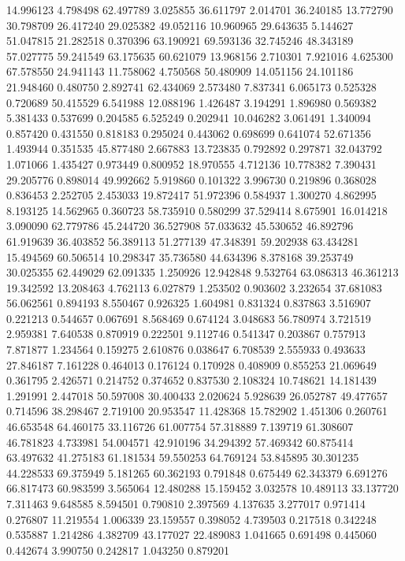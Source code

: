 14.996123
4.798498
62.497789
3.025855
36.611797
2.014701
36.240185
13.772790
30.798709
26.417240
29.025382
49.052116
10.960965
29.643635
5.144627
51.047815
21.282518
0.370396
63.190921
69.593136
32.745246
48.343189
57.027775
59.241549
63.175635
60.621079
13.968156
2.710301
7.921016
4.625300
67.578550
24.941143
11.758062
4.750568
50.480909
14.051156
24.101186
21.948460
0.480750
2.892741
62.434069
2.573480
7.837341
6.065173
0.525328
0.720689
50.415529
6.541988
12.088196
1.426487
3.194291
1.896980
0.569382
5.381433
0.537699
0.204585
6.525249
0.202941
10.046282
3.061491
1.340094
0.857420
0.431550
0.818183
0.295024
0.443062
0.698699
0.641074
52.671356
1.493944
0.351535
45.877480
2.667883
13.723835
0.792892
0.297871
32.043792
1.071066
1.435427
0.973449
0.800952
18.970555
4.712136
10.778382
7.390431
29.205776
0.898014
49.992662
5.919860
0.101322
3.996730
0.219896
0.368028
0.836453
2.252705
2.453033
19.872417
51.972396
0.584937
1.300270
4.862995
8.193125
14.562965
0.360723
58.735910
0.580299
37.529414
8.675901
16.014218
3.090090
62.779786
45.244720
36.527908
57.033632
45.530652
46.892796
61.919639
36.403852
56.389113
51.277139
47.348391
59.202938
63.434281
15.494569
60.506514
10.298347
35.736580
44.634396
8.378168
39.253749
30.025355
62.449029
62.091335
1.250926
12.942848
9.532764
63.086313
46.361213
19.342592
13.208463
4.762113
6.027879
1.253502
0.903602
3.232654
37.681083
56.062561
0.894193
8.550467
0.926325
1.604981
0.831324
0.837863
3.516907
0.221213
0.544657
0.067691
8.568469
0.674124
3.048683
56.780974
3.721519
2.959381
7.640538
0.870919
0.222501
9.112746
0.541347
0.203867
0.757913
7.871877
1.234564
0.159275
2.610876
0.038647
6.708539
2.555933
0.493633
27.846187
7.161228
0.464013
0.176124
0.170928
0.408909
0.855253
21.069649
0.361795
2.426571
0.214752
0.374652
0.837530
2.108324
10.748621
14.181439
1.291991
2.447018
50.597008
30.400433
2.020624
5.928639
26.052787
49.477657
0.714596
38.298467
2.719100
20.953547
11.428368
15.782902
1.451306
0.260761
46.653548
64.460175
33.116726
61.007754
57.318889
7.139719
61.308607
46.781823
4.733981
54.004571
42.910196
34.294392
57.469342
60.875414
63.497632
41.275183
61.181534
59.550253
64.769124
53.845895
30.301235
44.228533
69.375949
5.181265
60.362193
0.791848
0.675449
62.343379
6.691276
66.817473
60.983599
3.565064
12.480288
15.159452
3.032578
10.489113
33.137720
7.311463
9.648585
8.594501
0.790810
2.397569
4.137635
3.277017
0.971414
0.276807
11.219554
1.006339
23.159557
0.398052
4.739503
0.217518
0.342248
0.535887
1.214286
4.382709
43.177027
22.489083
1.041665
0.691498
0.445060
0.442674
3.990750
0.242817
1.043250
0.879201
